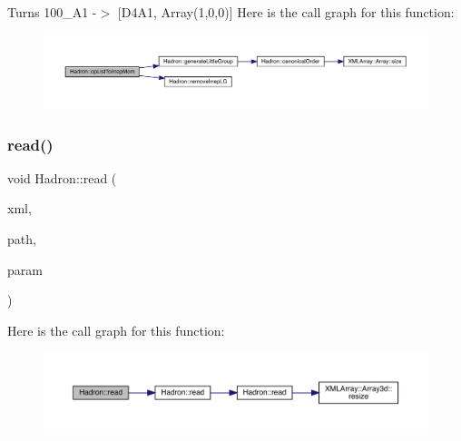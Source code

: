 Turns 100\+\_\+\+A1 -\/$>$ \mbox{[}D4\+A1, Array(1,0,0)\mbox{]} Here is the call graph for this function\+:
\nopagebreak
\begin{figure}[H]
\begin{center}
\leavevmode
\includegraphics[width=350pt]{d1/daf/namespaceHadron_a8bd515c92e3dbbe8e9741b25d71edc60_cgraph}
\end{center}
\end{figure}
\mbox{\label{namespaceHadron_ae9e95e7c9b97a878e77c48ea5619a53a}} 
\subsubsection{\texorpdfstring{read()}{read()}\hspace{0.1cm}{\footnotesize\ttfamily [1/94]}}
{\footnotesize\ttfamily void Hadron\+::read (\begin{DoxyParamCaption}\item[{\mbox{\hyperlink{classADATXML_1_1XMLReader}{X\+M\+L\+Reader}} \&}]{xml,  }\item[{const std\+::string \&}]{path,  }\item[{\mbox{\hyperlink{structHadron_1_1HadronNptType__t}{Hadron\+Npt\+Type\+\_\+t}} \&}]{param }\end{DoxyParamCaption})}

Here is the call graph for this function\+:
\nopagebreak
\begin{figure}[H]
\begin{center}
\leavevmode
\includegraphics[width=350pt]{d1/daf/namespaceHadron_ae9e95e7c9b97a878e77c48ea5619a53a_cgraph}
\end{center}
\end{figure}
\mbox{\label{namespaceHadron_ad884472dd0b4c3567f37f8320b63dee3}} 
